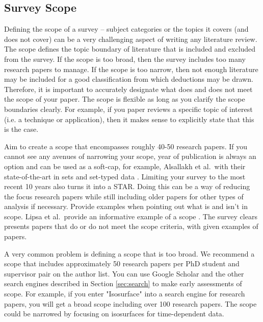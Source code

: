 \subsection{Survey Scope \cons} \label{sec:scope}
Defining the scope of a survey -- subject categories or the topics it covers (and does not cover) can be a very challenging aspect of writing any literature review. The scope defines the topic boundary of literature that is included and excluded from the survey. If the scope is too broad, then the survey includes too many research papers to manage. If the scope is too narrow, then not enough literature may be included for a good classification from which deductions may be drawn. Therefore, it is important to accurately designate what does and does not meet the scope of your paper. The scope is flexible as long as you clarify the scope boundaries clearly. For example, if you paper reviews a specific topic of interest (i.e. a technique or application), then it makes sense to explicitly state that this is the case.

Aim to create a scope that encompasses roughly 40-50 research papers. If you cannot see any avenues of narrowing your scope, year of publication is always an option and can be used as a soft-cap, for example, Alsallakh et al.\ with their state-of-the-art in sets and set-typed data \cite{alsallakh2014visualising}. Limiting your survey to the most recent 10 years also turns it into a STAR. Doing this can be a way of reducing the focus research papers while still including older papers for other types of analysis if necessary. Provide examples when pointing out what is and isn't in scope. Lipsa et al.\ provide an informative example of a scope \cite{lipsa2012visualization}. The survey clears presents papers that do or do not meet the scope criteria, with given examples of papers.

A very common problem is defining a scope that is too broad. We recommend a scope that includes approximately 50 research papers per PhD student and supervisor pair on the author list. You can use Google Scholar and the other search engines described in Section \ref{sec:search} to make early assessments of scope. For example, if you enter "Isosurface" into a search engine for research papers, you will get a broad scope including over 100 research papers. The scope could be narrowed by focusing on isosurfaces for time-dependent data.

